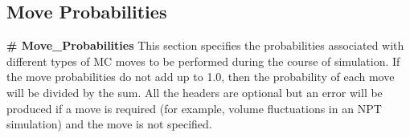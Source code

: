 \subsection{Move Probabilities}\label{sec:Move_Probabilities}
{\bf \# Move\_Probabilities} 
%
This section specifies the probabilities associated with different types of
MC moves to be performed during the course of simulation. 
If the move probabilities do not add up to 1.0, then the probability of each move
will be divided by the sum.
All the headers are optional but an error will be produced if a move is required 
(for example, volume fluctuations in an NPT simulation) 
and the move is not specified.
%
%
%
%
%
%
